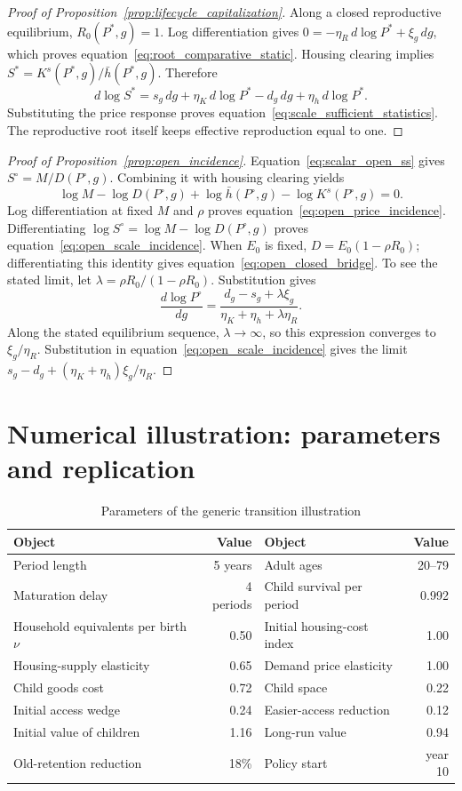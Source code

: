 \documentclass[11pt]{article}
\theoremstyle{definition}
\newcommand{\1}{\mathbf 1}
\begin{document}
\begin{proof}[Proof of Proposition~\ref{prop:lifecycle_capitalization}]
Along a closed reproductive equilibrium, $R_0(P^*,g)=1$. Log differentiation
gives $0=-\eta_R\,d\log P^*+\xi_g\,dg$, which proves
equation~\eqref{eq:root_comparative_static}. Housing clearing implies
$S^*=K^s(P^*,g)/\bar h(P^*,g)$. Therefore
\[
 d\log S^*
 =s_g\,dg+\eta_K\,d\log P^*
  -d_g\,dg+\eta_h\,d\log P^*.
\]
Substituting the price response proves
equation~\eqref{eq:scale_sufficient_statistics}. The reproductive root itself
keeps effective reproduction equal to one.
\end{proof}

\begin{proof}[Proof of Proposition~\ref{prop:open_incidence}]
Equation~\eqref{eq:scalar_open_ss} gives
$S^\circ=M/D(P^\circ,g)$. Combining it with housing clearing yields
\[
 \log M-\log D(P^\circ,g)+\log\bar h(P^\circ,g)
 -\log K^s(P^\circ,g)=0.
\]
Log differentiation at fixed $M$ and $\rho$ proves
equation~\eqref{eq:open_price_incidence}. Differentiating
$\log S^\circ=\log M-\log D(P^\circ,g)$ proves
equation~\eqref{eq:open_scale_incidence}. When $E_0$ is fixed,
$D=E_0(1-\rho R_0)$; differentiating this identity gives
equation~\eqref{eq:open_closed_bridge}. To see the stated limit, let
$\lambda=\rho R_0/(1-\rho R_0)$. Substitution gives
\[
 \frac{d\log P^\circ}{dg}
 =\frac{d_g-s_g+\lambda\xi_g}
 {\eta_K+\eta_h+\lambda\eta_R}.
\]
Along the stated equilibrium sequence, $\lambda\to\infty$, so this expression
converges to $\xi_g/\eta_R$. Substitution in
equation~\eqref{eq:open_scale_incidence} gives the limit
$s_g-d_g+(\eta_K+\eta_h)\xi_g/\eta_R$.
\end{proof}

\section{Numerical illustration: parameters and replication}
\label{app:numerics}

\begin{table}[H]
\centering
\caption{Parameters of the generic transition illustration}
\label{tab:illustration_parameters}
\small
\begin{tabular}{lrlr}
\toprule
Object & Value & Object & Value \\
\midrule
Period length & 5 years & Adult ages & 20--79 \\
Maturation delay & 4 periods & Child survival per period & 0.992 \\
Household equivalents per birth $\nu$ & 0.50 & Initial housing-cost index & 1.00 \\
Housing-supply elasticity & 0.65 & Demand price elasticity & 1.00 \\
Child goods cost & 0.72 & Child space & 0.22 \\
Initial access wedge & 0.24 & Easier-access reduction & 0.12 \\
Initial value of children & 1.16 & Long-run value & 0.94 \\
Old-retention reduction & 18\% & Policy start & year 10 \\
\bottomrule
\end{tabular}
\end{table}
\end{document}
